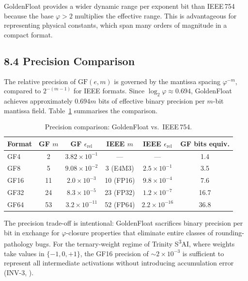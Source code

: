 GoldenFloat provides a wider dynamic range per exponent bit than IEEE\,754
because the base \(\varphi > 2\) multiplies the effective range. This is
advantageous for representing physical constants, which span many orders of
magnitude in a compact format.

\subsection{8.4 Precision Comparison}\label{fa_04:gf-precision}

The relative precision of \(\mathrm{GF}(e,m)\) is governed by the mantissa
spacing \(\varphi^{-m}\), compared to \(2^{-(m-1)}\) for IEEE formats.
Since \(\log_2 \varphi \approx 0.694\), GoldenFloat achieves approximately
\(0.694m\) bits of effective binary precision per \(m\)-bit mantissa field.
Table~\ref{fa_04:tab:precision} summarises the comparison.

\begin{table}[h]
\centering
\caption{Precision comparison: GoldenFloat vs.\ IEEE\,754.}
\label{fa_04:tab:precision}
\begin{tabular}{@{}lccccc@{}}
\toprule
Format & GF \(m\) & GF \(\epsilon_{\text{rel}}\) & IEEE \(m\) & IEEE \(\epsilon_{\text{rel}}\) & GF bits equiv. \\
\midrule
GF4  & 2 & \(3.82 \times 10^{-1}\) & --- & --- & 1.4 \\
GF8  & 5 & \(9.08 \times 10^{-2}\) & 3 (E4M3) & \(2.5 \times 10^{-1}\) & 3.5 \\
GF16 & 11 & \(2.0 \times 10^{-3}\) & 10 (FP16) & \(9.8 \times 10^{-4}\) & 7.6 \\
GF32 & 24 & \(8.3 \times 10^{-5}\) & 23 (FP32) & \(1.2 \times 10^{-7}\) & 16.7 \\
GF64 & 53 & \(3.2 \times 10^{-11}\) & 52 (FP64) & \(2.2 \times 10^{-16}\) & 36.8 \\
\bottomrule
\end{tabular}
\end{table}

The precision trade-off is intentional: GoldenFloat sacrifices binary
precision per bit in exchange for \(\varphi\)-closure properties that
eliminate entire classes of rounding-pathology bugs. For the ternary-weight
regime of Trinity S\textsuperscript{3}AI, where weights take values in
\(\{-1, 0, +1\}\), the GF16 precision of \(\sim 2 \times 10^{-3}\) is
sufficient to represent all intermediate activations without introducing
accumulation error (INV-3, \cite{t27spec}).

